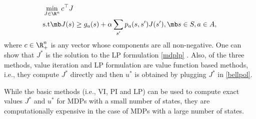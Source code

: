 \begin{align}\label{mdplp}
\begin{split}
\min_{J\in \R^n} \,&c^\top J\\
\text{s.t}\mb &J(s)\geq g_a(s)+\alpha\sum_{s'}p_a(s,s')J(s'), \mb s\in S, a \in A,
\end{split}
\end{align}
where $c\in \R^n_+$ is any vector whose components are all non-negative. One can show that $J^*$ is the solution to the LP formulation \eqref{mdplp} \cite{BertB}. 
Also, of the three methods, value iteration and LP formulation are value function based methods, i.e., they compute $J^*$ directly and then $u^*$ is obtained by plugging $J^*$ in \eqref{bellpol}.

While the basic methods (i.e., VI, PI and LP) can be used to compute exact values $J^*$ and $u^*$ for MDPs with a small number of states, they are computationally expensive in the case of MDPs with a large number of states.



